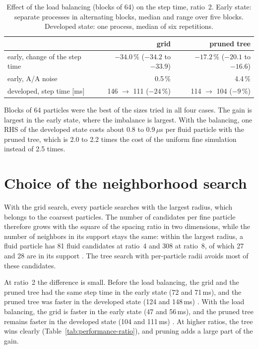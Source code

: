 \begin{table}[htb]
  \centering
  \caption{Effect of the load balancing (blocks of 64) on the step time, ratio~2.
  Early state: separate processes in alternating blocks, median and range over five blocks.
  Developed state: one process, median of six repetitions. }
  \label{tab:performance-balancing}
  \small
  \begin{tabular}{lrr}
    \toprule
    & grid & pruned tree \\
    \midrule
    early, change of the step time & $-34.0\,\%$ ($-34.2$ to $-33.9$) &
      $-17.2\,\%$ ($-20.1$ to $-16.6$) \\
    early, A/A noise & 0.5\,\% & 4.4\,\% \\
    developed, step time [ms] & 146 $\to$ 111 ($-24\,\%$) & 114 $\to$ 104 ($-9\,\%$) \\
    \bottomrule
  \end{tabular}
\end{table}

Blocks of 64 particles were the best of the sizes tried in all four cases. The gain is
largest in the early state, where the imbalance is largest. With the balancing, one RHS of
the developed state costs about 0.8 to 0.9\,$\mu$s per fluid particle with the pruned tree,
which is 2.0 to 2.2 times the cost of the uniform fine simulation instead of 2.5 times.

\section{Choice of the neighborhood search}
\label{sec:performance-nhs}

With the grid search, every particle searches with the largest radius, which belongs to the
coarsest particles. The number of candidates per fine particle therefore grows with the
square of the spacing ratio in two dimensions, while the number of neighbors in its
support stays the same: within the largest radius, a fluid particle has 81 fluid
candidates at ratio~4 and 308 at ratio~8, of which 27 and 28 are in its support .
The tree search with per-particle radii avoids most of these candidates.

At ratio~2 the difference is small. Before the load balancing, the grid and the pruned tree
had the same step time in the early state (72 and 71\,ms), and the pruned tree was faster in
the developed state (124 and 148\,ms) . With the load balancing, the grid is faster
in the early state (47 and 56\,ms), and the pruned tree remains faster in the developed state
(104 and 111\,ms) . At higher ratios, the tree wins clearly
(Table~\ref{tab:performance-ratio}), and pruning adds a large part of the gain.

